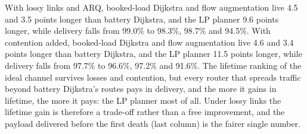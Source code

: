 With lossy links and ARQ, booked-load Dijkstra and flow augmentation live 4.5 and 3.5 points longer than battery Dijkstra, and the LP planner 9.6 points longer, while delivery falls from 99.0\% to 98.3\%, 98.7\% and 94.5\%. With contention added, booked-load Dijkstra and flow augmentation live 4.6 and 3.4 points longer than battery Dijkstra, and the LP planner 11.5 points longer, while delivery falls from 97.7\% to 96.6\%, 97.2\% and 91.6\%. The lifetime ranking of the ideal channel survives losses and contention, but every router that spreads traffic beyond battery Dijkstra's routes pays in delivery, and the more it gains in lifetime, the more it pays: the LP planner most of all. Under lossy links the lifetime gain is therefore a trade-off rather than a free improvement, and the payload delivered before the first death (last column) is the fairer single number.
